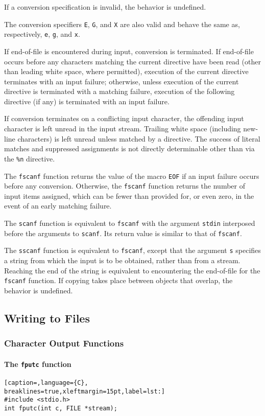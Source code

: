 If a conversion specification is invalid, the behavior is undefined.

The conversion specifiers \texttt{E}, \texttt{G}, and \texttt{X} are also valid
and behave the same as, respectively, \texttt{e}, \texttt{g}, and \texttt{x}.

If end-of-file is encountered during input, conversion is terminated. If
end-of-file occurs before any characters matching the current directive have
been read (other than leading white space, where permitted), execution of the
current directive terminates with an input failure; otherwise, unless execution
of the current directive is terminated with a matching failure, execution of
the following directive (if any) is terminated with an input failure.

If conversion terminates on a conflicting input character, the offending input
character is left unread in the input stream. Trailing white space (including
new-line characters) is left unread unless matched by a directive. The success
of literal matches and suppressed assignments is not directly determinable
other than via the \texttt{\%n} directive.

The \texttt{fscanf} function returns the value of the macro \texttt{EOF} if an
input failure occurs before any conversion. Otherwise, the \texttt{fscanf}
function returns the number of input items assigned, which can be fewer than
provided for, or even zero, in the event of an early matching failure.

The \texttt{scanf} function is equivalent to \texttt{fscanf} with the argument
\texttt{stdin} interposed before the arguments to \texttt{scanf}. Its return
value is similar to that of \texttt{fscanf}.

The \texttt{sscanf} function is equivalent to \texttt{fscanf}, except that the
argument \texttt{s} specifies a string from which the input is to be obtained,
rather than from a stream. Reaching the end of the string is equivalent to
encountering the end-of-file for the \texttt{fscanf} function. If copying takes
place between objects that overlap, the behavior is undefined.

\subsection{Writing to Files}
\subsubsection{Character Output Functions}
\paragraph{The \texttt{fputc} function}
\lstset{basicstyle=\scriptsize, numbers=left, captionpos=b, tabsize=4}
\begin{lstlisting}[caption=,language={C},
breaklines=true,xleftmargin=15pt,label=lst:]
#include <stdio.h>
int fputc(int c, FILE *stream);
\end{lstlisting}

